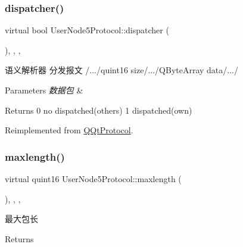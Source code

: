 \subsubsection{\texorpdfstring{dispatcher()}{dispatcher()}}
{\footnotesize\ttfamily virtual bool User\+Node5\+Protocol\+::dispatcher (\begin{DoxyParamCaption}\item[{const Q\+Byte\+Array \&}]{ }\end{DoxyParamCaption})\hspace{0.3cm}{\ttfamily [inline]}, {\ttfamily [override]}, {\ttfamily [protected]}, {\ttfamily [virtual]}}



语义解析器 分发报文 /.../quint16 size/.../\+Q\+Byte\+Array data/.../ 


\begin{DoxyParams}{Parameters}
{\em 数据包} & \\
\hline
\end{DoxyParams}
\begin{DoxyReturn}{Returns}
0 no dispatched(others) 1 dispatched(own) 
\end{DoxyReturn}


Reimplemented from \mbox{\hyperlink{class_q_qt_protocol_a35a69c4b89c8cf7459038f40d75e0dc9}{Q\+Qt\+Protocol}}.

\mbox{\label{class_user_node5_protocol_ad69cf7619d98dc8d3a4f4ee4f3da03b9}} 
\subsubsection{\texorpdfstring{maxlength()}{maxlength()}}
{\footnotesize\ttfamily virtual quint16 User\+Node5\+Protocol\+::maxlength (\begin{DoxyParamCaption}{ }\end{DoxyParamCaption})\hspace{0.3cm}{\ttfamily [inline]}, {\ttfamily [override]}, {\ttfamily [protected]}, {\ttfamily [virtual]}}



最大包长 

\begin{DoxyReturn}{Returns}

\end{DoxyReturn}


